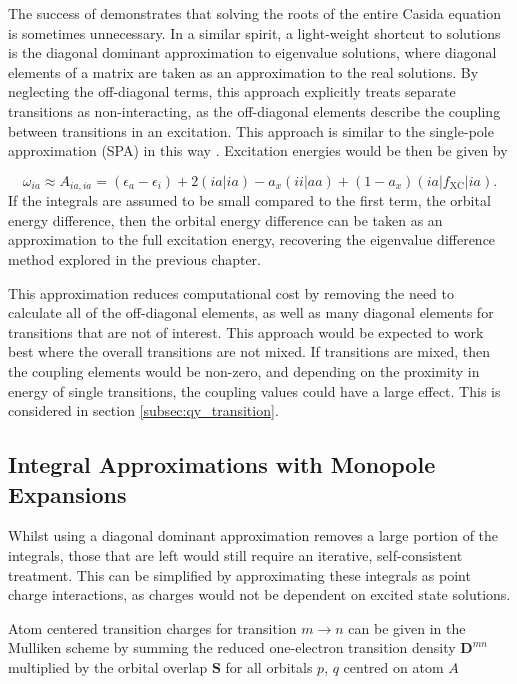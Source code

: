 The success of \dscf demonstrates that solving the roots of the entire Casida equation
is sometimes unnecessary. In a similar spirit, a light-weight shortcut to solutions 
is the diagonal dominant approximation to eigenvalue solutions, where diagonal elements
of a matrix are taken as an approximation to the real solutions. By neglecting the
off-diagonal terms, this approach explicitly treats separate transitions as non-interacting,
as the off-diagonal elements describe the coupling between transitions in an excitation.
This approach is similar to the single-pole approximation (SPA) in this way \cite{Petersilka1996, Appel2006}.
Excitation energies would be then be given by

\begin{equation}
\omega_{ia} \approx A_{ia, ia} = \left( \epsilon_a - \epsilon_i \right) + 2\left(ia|ia\right) - a_x\left(ii|aa\right) + (1- a_x)\left(ia|f_{\text{XC}}|ia\right). 
\label{eq:diag_dom}
\end{equation}
%
If the integrals are assumed to be small compared to the first term, the orbital 
energy difference, then the orbital energy difference can be taken as an approximation 
to the full excitation energy, recovering the eigenvalue difference method explored 
in the previous chapter.

This approximation reduces computational cost by removing the need to calculate
all of the off-diagonal elements, as well as many diagonal elements for transitions
that are not of interest. This approach would be expected to work best where the
overall transitions are not mixed. If transitions are mixed, then the coupling elements
would be non-zero, and depending on the proximity in energy of single transitions,
the coupling values could have a large effect. This is considered in section \ref{subsec:qy_transition}.

\subsection{Integral Approximations with Monopole Expansions}
\label{subsec:MNOK}

Whilst using a diagonal dominant approximation removes a large portion of the integrals,
those that are left would still require an iterative, self-consistent treatment. 
This can be simplified by approximating these integrals as point charge interactions, 
as charges would not be dependent on excited state solutions.

Atom centered transition charges for transition $m \rightarrow n$ can be given in
the Mulliken scheme by summing the reduced one-electron transition density $\mathbf{D}^{mn}$
multiplied by the orbital overlap $\mathbf{S}$ for all orbitals $p$, $q$ centred
on atom $A$

